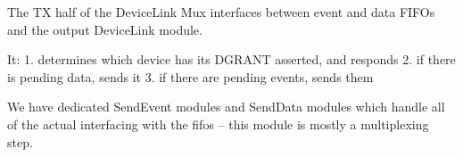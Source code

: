 The TX half of the DeviceLink Mux interfaces between event and data FIFOs and the output DeviceLink module. 

It: 
  1. determines which device has its DGRANT asserted, and responds
  2. if there is pending data, sends it
  3. if there are pending events, sends them

We have dedicated SendEvent modules and SendData modules which handle all of the actual interfacing with the fifos -- this module is mostly a multiplexing step. 


